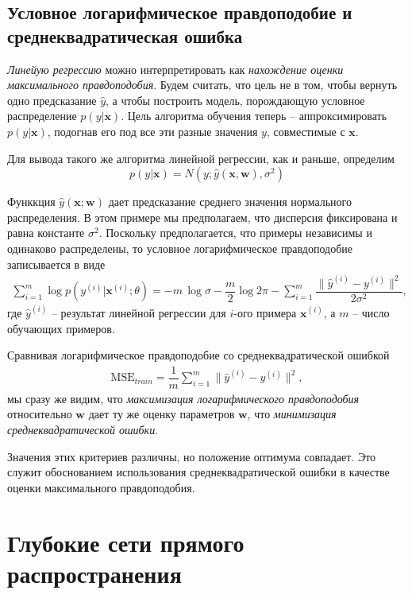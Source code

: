 \documentclass[%
	11pt,
	a4paper,
	utf8,
]{article}
\begin{document}
\subsection{Условное логарифмическое правдоподобие и среднеквадратическая ошибка}

\emph{Линейую регрессию} можно интерпретировать как \emph{нахождение оценки максимального правдоподобия}. Будем считать, что цель не в том, чтобы вернуть одно предсказание $ \hat{y} $, а чтобы построить модель, порождающую условное распределение $ p(y | \mathbf{x}) $. Цель алгоритма обучения теперь -- аппроксимировать $ p(y | \mathbf{x}) $, подогнав его под все эти разные значения $ y $, совместимые с $ \mathbf{x} $.

Для вывода такого же алгоритма линейной регрессии, как и раньше, определим
$$
p(y | \mathbf{x}) = N(y; \hat{y}(\mathbf{x}, \mathbf{w}), \sigma^2)
$$

Функкция $ \hat{y}(\mathbf{x}; \mathbf{w}) $ дает предсказание среднего значения нормального распределения. В этом примере мы предполагаем, что дисперсия фиксирована и равна константе $ \sigma^2 $. Поскольку предполагается, что примеры независимы и одинаково распределены, то условное логарифмическое правдоподобие записывается в виде
\begin{align*}
	\sum_{i=1}^{m} \log p(y^{(i)} | \mathbf{x}^{(i)}; {\theta}) = -m \, \log \sigma - \dfrac{m}{2} \log 2 \pi - \sum_{i=1}^{m} \dfrac{ \| \hat{y}^{(i)} - y^{(i)} \|^2 }{ 2 \sigma^2 },
\end{align*}
где $ \hat{y}^{(i)} $ -- результат линейной регрессии для $ i $-ого примера $ \mathbf{x}^{(i)} $, а $ m $ -- число обучающих примеров.

Сравнивая логарифмическое правдоподобие со среднеквадратической ошибкой
\begin{align*}
	\text{MSE}_{train} = \dfrac{1}{m} \sum_{i=1}^{m} \| \hat{y}^{(i)} - y^{(i)} \|^2,
\end{align*}
мы сразу же видим, что \emph{максимизация логарифмического правдоподобия} относительно $ \mathbf{w} $ дает ту же оценку параметров $ \mathbf{w} $, что \emph{минимизация среднеквадратической ошибки}.

Значения этих критериев различны, но положение оптимума совпадает. Это служит обоснованием использования среднеквадратической ошибки в качестве оценки максимального правдоподобия.

\section{Глубокие сети прямого распространения}
\end{document}
